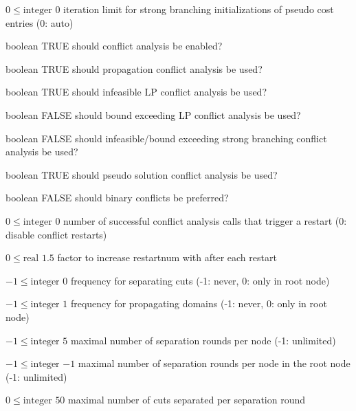 %
{$0\leq\textrm{integer}$}%
{$0$}%
{iteration limit for strong branching initializations of pseudo cost entries (0: auto)}%
{}

%
{boolean}%
{TRUE}%
{should conflict analysis be enabled?}%
{}

%
{boolean}%
{TRUE}%
{should propagation conflict analysis be used?}%
{}

%
{boolean}%
{TRUE}%
{should infeasible LP conflict analysis be used?}%
{}

%
{boolean}%
{FALSE}%
{should bound exceeding LP conflict analysis be used?}%
{}

%
{boolean}%
{FALSE}%
{should infeasible/bound exceeding strong branching conflict analysis be used?}%
{}

%
{boolean}%
{TRUE}%
{should pseudo solution conflict analysis be used?}%
{}

%
{boolean}%
{FALSE}%
{should binary conflicts be preferred?}%
{}

%
{$0\leq\textrm{integer}$}%
{$0$}%
{number of successful conflict analysis calls that trigger a restart (0: disable conflict restarts)}%
{}

%
{$0\leq\textrm{real}$}%
{$1.5$}%
{factor to increase restartnum with after each restart}%
{}

%
{$-1\leq\textrm{integer}$}%
{$0$}%
{frequency for separating cuts (-1: never, 0: only in root node)}%
{}

%
{$-1\leq\textrm{integer}$}%
{$1$}%
{frequency for propagating domains (-1: never, 0: only in root node)}%
{}

%
{$-1\leq\textrm{integer}$}%
{$5$}%
{maximal number of separation rounds per node (-1: unlimited)}%
{}

%
{$-1\leq\textrm{integer}$}%
{$-1$}%
{maximal number of separation rounds per node in the root node (-1: unlimited)}%
{}

%
{$0\leq\textrm{integer}$}%
{$50$}%
{maximal number of cuts separated per separation round}%
{}

